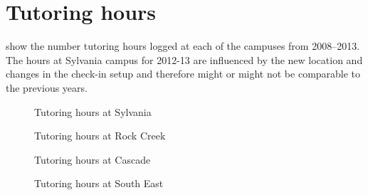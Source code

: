 \chapter{Tutoring hours}\label{app:sec:tutoringhours}

 show
the number tutoring hours logged at each of the campuses from 2008--2013. The hours at Sylvania campus for 2012-13 are influenced by the new location and changes in the check-in setup and therefore might or might not be comparable to the previous years.

\begin{figure}[!htb]
	\captionsetup{skip=0pt}
  \begin{widepage}
  \begin{minipage}{.4\textwidth}
    \centering
	
    \caption{Tutoring hours at Sylvania}
    \label{app:fig:tutoringsylvania}
  \end{minipage}%
  \hfill
  \begin{minipage}{.4\textwidth}
    \centering
	
    \caption{Tutoring hours at Rock Creek}
    \label{app:fig:tutoringrockcreek}
  \end{minipage}%
  \end{widepage}
\end{figure}

\begin{figure}[!htb]
	\captionsetup{skip=0pt}
  \begin{widepage}
  \begin{minipage}{.4\textwidth}
    \centering
	
    \caption{Tutoring hours at Cascade}
    \label{app:fig:tutoringCascade}
  \end{minipage}%
  \hfill
  \begin{minipage}{.4\textwidth}
    \centering
	
    \caption{Tutoring hours at South East}
    \label{app:fig:tutoringsoutheast}
  \end{minipage}%
  \end{widepage}
\end{figure}
